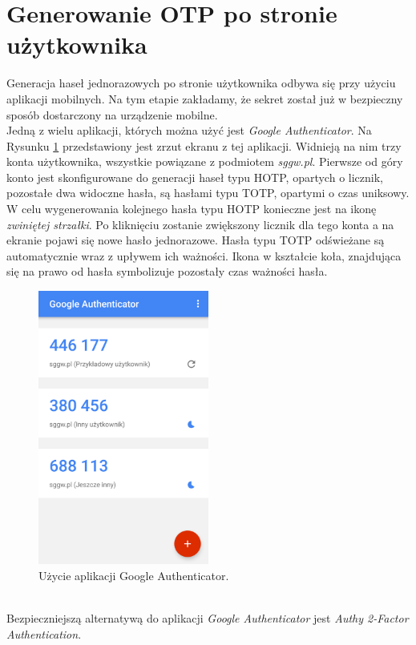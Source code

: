 \section{Generowanie OTP po stronie użytkownika}
Generacja haseł jednorazowych po stronie użytkownika odbywa się przy użyciu aplikacji mobilnych. 
Na tym etapie zakładamy, że sekret został już w bezpieczny sposób dostarczony na urządzenie mobilne. \\
Jedną z wielu aplikacji, których można użyć jest \textit{Google Authenticator}. 
Na Rysunku \ref{mobile-google} przedstawiony jest zrzut ekranu z tej aplikacji. 
Widnieją na nim trzy konta użytkownika, wszystkie powiązane z podmiotem \textit{sggw.pl}. 
Pierwsze od góry konto jest skonfigurowane do generacji haseł typu HOTP, opartych o licznik,
pozostałe dwa widoczne hasła, są hasłami typu TOTP, opartymi o czas uniksowy.
W celu wygenerowania kolejnego hasła typu HOTP konieczne jest na ikonę \textit{zwiniętej strzałki}.
Po kliknięciu zostanie zwiększony licznik dla tego konta a na ekranie pojawi się nowe hasło jednorazowe.
Hasła typu TOTP odświeżane są automatycznie wraz z upływem ich ważności. 
Ikona w kształcie koła, znajdująca się na prawo od hasła symbolizuje pozostały czas ważności hasła.
\begin{figure}[t]
    \centering
	\includegraphics[width=0.5\textwidth]{content/images/mobile-google}
	\caption{Użycie aplikacji Google Authenticator.}
    \label{mobile-google}
\end{figure} \\
Bezpieczniejszą alternatywą do aplikacji \textit{Google Authenticator} jest \textit{Authy 2-Factor Authentication}. 
